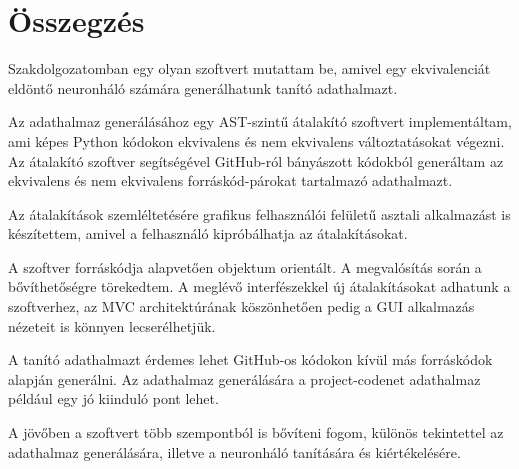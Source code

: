 \chapter{Összegzés}
\label{ch:sum}

Szakdolgozatomban egy olyan szoftvert mutattam be,
amivel egy ekvivalenciát eldöntő neuronháló számára generálhatunk tanító adathalmazt.

Az adathalmaz generálásához egy AST-szintű átalakító szoftvert implementáltam,
ami képes Python kódokon ekvivalens és nem ekvivalens változtatásokat végezni.
Az átalakító szoftver segítségével GitHub-ról bányászott kódokból generáltam
az ekvivalens és nem ekvivalens forráskód-párokat tartalmazó adathalmazt.

Az átalakítások szemléltetésére grafikus felhasználói felületű asztali alkalmazást is készítettem,
amivel a felhasználó kipróbálhatja az átalakításokat.

A szoftver forráskódja alapvetően objektum orientált.
A megvalósítás során a bővíthetőségre törekedtem.
A meglévő interfészekkel új átalakításokat adhatunk a szoftverhez, az MVC architektúrának köszönhetően pedig a GUI alkalmazás nézeteit is könnyen lecserélhetjük.

A tanító adathalmazt érdemes lehet GitHub-os kódokon kívül más forráskódok alapján generálni.
Az adathalmaz generálására a project-codenet \cite{puri2021codenet} adathalmaz például egy jó kiinduló pont lehet.

A jövőben a szoftvert több szempontból is bővíteni fogom, különös tekintettel
az adathalmaz generálására, illetve a neuronháló tanítására és kiértékelésére.
